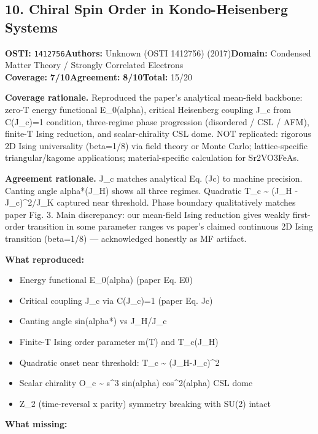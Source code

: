 \documentclass[11pt]{article}
\newcommand{\scorebadge}[2]{\textbf{#1:} \textbf{#2/10}}
\begin{document}
\subsection{10. Chiral Spin Order in Kondo-Heisenberg Systems}
\textbf{OSTI:} \texttt{1412756}\quad\textbf{Authors:} Unknown (OSTI 1412756) (2017)\quad\textbf{Domain:} Condensed Matter Theory / Strongly Correlated Electrons\\
\scorebadge{Coverage}{7}\quad\scorebadge{Agreement}{8}\quad\textbf{Total:} 15/20\par\smallskip
\noindent\textbf{Coverage rationale.} Reproduced the paper's analytical mean-field backbone: zero-T energy functional E\_0(alpha), critical Heisenberg coupling J\_c from C(J\_c)=1 condition, three-regime phase progression (disordered / CSL / AFM), finite-T Ising reduction, and scalar-chirality CSL dome. NOT replicated: rigorous 2D Ising universality (beta=1/8) via field theory or Monte Carlo; lattice-specific triangular/kagome applications; material-specific calculation for Sr2VO3FeAs.\par
\noindent\textbf{Agreement rationale.} J\_c matches analytical Eq. (Jc) to machine precision. Canting angle alpha*(J\_H) shows all three regimes. Quadratic T\_c \textasciitilde{} (J\_H - J\_c)\textasciicircum{}2/J\_K captured near threshold. Phase boundary qualitatively matches paper Fig. 3. Main discrepancy: our mean-field Ising reduction gives weakly first-order transition in some parameter ranges vs paper's claimed continuous 2D Ising transition (beta=1/8) --- acknowledged honestly as MF artifact.\par\smallskip
\noindent\textbf{What reproduced:}
\begin{itemize}[leftmargin=1.4em,itemsep=0.2em,topsep=0.2em]
\item Energy functional E\_0(alpha) (paper Eq. E0)
\item Critical coupling J\_c via C(J\_c)=1 (paper Eq. Jc)
\item Canting angle sin(alpha*) vs J\_H/J\_c
\item Finite-T Ising order parameter m(T) and T\_c(J\_H)
\item Quadratic onset near threshold: T\_c \textasciitilde{} (J\_H-J\_c)\textasciicircum{}2
\item Scalar chirality O\_c \textasciitilde{} s\textasciicircum{}3 sin(alpha) cos\textasciicircum{}2(alpha) CSL dome
\item Z\_2 (time-reversal x parity) symmetry breaking with SU(2) intact
\end{itemize}\noindent\textbf{What missing:}
\end{document}
